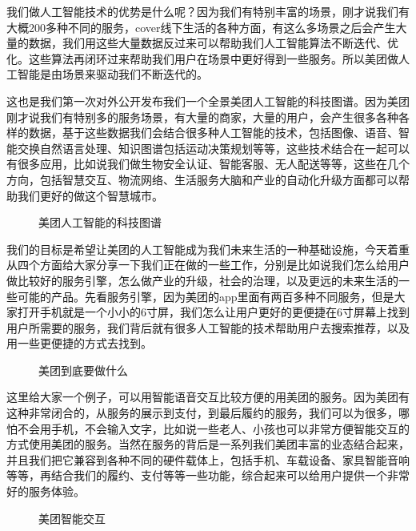 \documentclass[letterpaper,10pt,english]{sphinxmanual}
\begin{document}
我们做人工智能技术的优势是什么呢？因为我们有特别丰富的场景，刚才说我们有大概200多种不同的服务，cover线下生活的各种方面，有这么多场景之后会产生大量的数据，我们用这些大量数据反过来可以帮助我们人工智能算法不断迭代、优化。这些算法再闭环过来帮助我们用户在场景中更好得到一些服务。所以美团做人工智能是由场景来驱动我们不断迭代的。

这也是我们第一次对外公开发布我们一个全景美团人工智能的科技图谱。因为美团刚才说我们有特别多的服务场景，有大量的商家，大量的用户，会产生很多各种各样的数据，基于这些数据我们会结合很多种人工智能的技术，包括图像、语音、智能交换自然语言处理、知识图谱包括运动决策规划等等，这些技术结合在一起可以有很多应用，比如说我们做生物安全认证、智能客服、无人配送等等，这些在几个方向，包括智慧交互、物流网络、生活服务大脑和产业的自动化升级方面都可以帮助我们更好的做这个智慧城市。

\begin{figure}[H]
\centering
\capstart

\noindent{}
\caption{美团人工智能的科技图谱}\label{\detokenize{chapter_AI_company/meituan:id23}}\end{figure}

我们的目标是希望让美团的人工智能成为我们未来生活的一种基础设施，今天着重从四个方面给大家分享一下我们正在做的一些工作，分别是比如说我们怎么给用户做比较好的服务引擎，怎么做产业的升级，社会的治理，以及更远的未来生活的一些可能的产品。先看服务引擎，因为美团的app里面有两百多种不同服务，但是大家打开手机就是一个小小的6寸屏，我们怎么让用户更好的更便捷在6寸屏幕上找到用户所需要的服务，我们背后就有很多人工智能的技术帮助用户去搜索推荐，以及用一些更便捷的方式去找到。

\begin{figure}[H]
\centering
\capstart

\noindent{}
\caption{美团到底要做什么}\label{\detokenize{chapter_AI_company/meituan:id24}}\end{figure}

这里给大家一个例子，可以用智能语音交互比较方便的用美团的服务。因为美团有这种非常闭合的，从服务的展示到支付，到最后履约的服务，我们可以为很多，哪怕不会用手机，不会输入文字，比如说一些老人、小孩也可以非常方便智能交互的方式使用美团的服务。当然在服务的背后是一系列我们美团丰富的业态结合起来，并且我们把它兼容到各种不同的硬件载体上，包括手机、车载设备、家具智能音响等等，再结合我们的履约、支付等等一些功能，综合起来可以给用户提供一个非常好的服务体验。

\begin{figure}[H]
\centering
\capstart

\noindent{}
\caption{美团智能交互}\label{\detokenize{chapter_AI_company/meituan:id25}}\end{figure}
\end{document}
